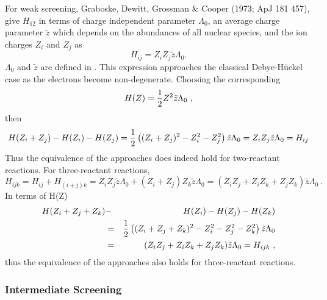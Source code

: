 \documentclass[12pt,modern,tighten,times,apj]{aastex61}
\begin{document}
For weak screening,  Graboske, Dewitt, Grossman \& Cooper (1973; ApJ 181 457), give $H_{12}$ in terms of charge independent parameter $\Lambda_0$, an average charge parameter $\tilde z$ which depends on the abundances of all nuclear species, and the ion charges $Z_i$ and $Z_j$ as 
\begin{equation}
H_{ij} = Z_i Z_j \tilde{z} \Lambda_0.  
\end{equation} 
$\Lambda_0$ and  $\tilde z$ are defined in \citet{DeGrCo73}. 
This expression approaches the classical Debye-H\"uckel case as the electrons become non-degenerate.  
Choosing the corresponding 
\begin{equation}
H(Z) = {1\over2} Z^2 \tilde{z} \Lambda_0 \ ,
\end{equation} 
then 
\begin{equation}
H(Z_i+Z_j) - H(Z_i) - H(Z_j) = {1\over2}\left((Z_i+Z_j)^2 - Z_i^2 - Z_j^2\right) \tilde{z} \Lambda_0  =  Z_i Z_j \tilde{z} \Lambda_0 = H_{ij}
\end{equation} 
Thus the equivalence of the approaches does indeed hold for two-reactant reactions.  
For three-reactant reactions, 
\begin{equation}
H_{ijk} = H_{ij} + H_{(i+j)k} = Z_i Z_j \tilde{z} \Lambda_0 + (Z_i+Z_j) Z_k \tilde{z} \Lambda_0 = (Z_i Z_j + Z_i Z_k + Z_j Z_k) \tilde{z} \Lambda_0 \ .
\end{equation}
In terms of H(Z)
\begin{eqnarray}
H(Z_i+Z_j+Z_k) &-&H(Z_i) - H(Z_j) - H(Z_k) \\
&=&  {1\over2}\left((Z_i+Z_j+Z_k)^2 - Z_i^2 - Z_j^2- Z_k^2\right) \tilde{z} \Lambda_0 \\
&=& (Z_i Z_j + Z_i Z_k + Z_j Z_k) \tilde{z} \Lambda_0 = H_{ijk} \ ,  
\end{eqnarray}
thus the equivalence of the approaches also holds for three-reactant reactions.  

\subsubsection{Intermediate Screening}
\end{document}
